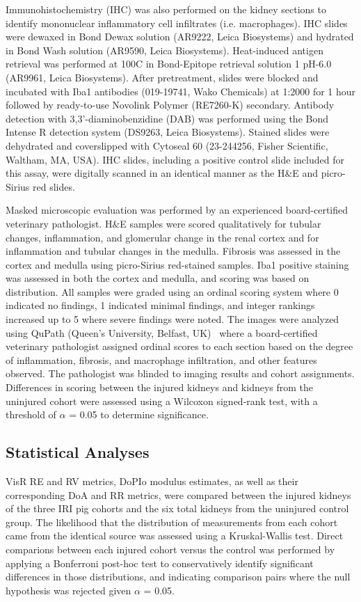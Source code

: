 Immunohistochemistry (IHC) was also performed on the kidney sections to identify mononuclear inflammatory cell infiltrates (i.e. macrophages). IHC slides were dewaxed in Bond Dewax solution (AR9222, Leica Biosystems) and hydrated in Bond Wash solution (AR9590, Leica Biosystems). Heat-induced antigen retrieval was performed at 100\textdegree{}C in Bond-Epitope retrieval solution 1 pH-6.0 (AR9961, Leica Biosystems). After pretreatment, slides were blocked and incubated with Iba1 antibodies (019-19741, Wako Chemicals) at 1:2000 for 1 hour followed by ready-to-use Novolink Polymer (RE7260-K) secondary. Antibody detection with 3,3'-diaminobenzidine (DAB) was performed using the Bond Intense R detection system (DS9263, Leica Biosystems). Stained slides were dehydrated and coverslipped with Cytoseal 60 (23-244256, Fisher Scientific, Waltham, MA, USA). IHC slides, including a positive control slide included for this assay, were digitally scanned in an identical manner as the H\&E and picro-Sirius red slides.

Masked microscopic evaluation was performed by an experienced board-certified veterinary pathologist. H\&E samples were scored qualitatively for tubular changes, inflammation, and glomerular change in the renal cortex and for inflammation and tubular changes in the medulla. Fibrosis was assessed in the cortex and medulla using picro-Sirius red-stained samples. Iba1 positive staining was assessed in both the cortex and medulla, and scoring was based on distribution. All samples were graded using an ordinal scoring system where 0 indicated no findings, 1 indicated minimal findings, and integer rankings increased up to 5 where severe findings were noted. The images were analyzed using QuPath (Queen's University, Belfast, UK)~\cite{bankhead_QuPath_2017} where a board-certified veterinary pathologist assigned ordinal scores to each section based on the degree of inflammation, fibrosis, and macrophage infiltration, and other features observed. The pathologist was blinded to imaging results and cohort assignments. Differences in scoring between the injured kidneys and kidneys from the uninjured cohort were assessed using a Wilcoxon signed-rank test, with a threshold of $\alpha$ = 0.05 to determine significance.

\subsection{Statistical Analyses}

VisR RE and RV metrics, DoPIo modulus estimates, as well as their corresponding DoA and RR metrics, were compared between the injured kidneys of the three IRI pig cohorts and the six total kidneys from the uninjured control group. The likelihood that the distribution of measurements from each cohort came from the identical source was assessed using a Kruskal-Wallis test. Direct comparions between each injured cohort versus the control was performed by applying a Bonferroni post-hoc test to conservatively identify significant differences in those distributions, and indicating comparison pairs where the null hypothesis was rejected given $\alpha$ = 0.05. 

